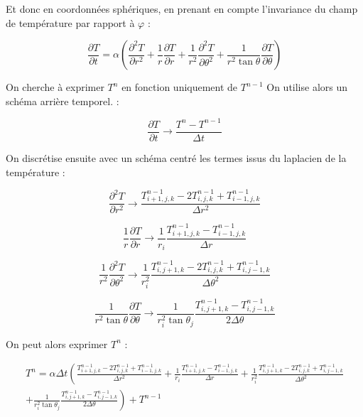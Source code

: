 \documentclass[fleqn]{article}
\renewcommand{\phi}{\varphi}
\begin{document}
Et donc en coordonnées sphériques, en prenant en compte l'invariance du champ de température par rapport à $\phi$  :

\begin{equation}
    \frac{ \partial T}{\partial t}  = \alpha \left( 
    {\frac {\partial ^{2}T}{\partial r^{2}}}+{\frac {1}{r}}{\frac {\partial T}{\partial r}}+{\frac {1}{r^{2}}}{\frac {\partial ^{2}T}{\partial \theta ^{2}}}+{\frac {1}{r^{2}\tan \theta }}{\frac {\partial T}{\partial \theta }} \right)      
\end{equation}

On cherche à exprimer $T^n $ en fonction uniquement de $T^{n-1}$ On utilise alors un schéma arrière temporel. : 

\begin{equation}
    \frac{ \partial T}{\partial t} \rightarrow  \frac{T^n - T^{n-1}}{\Delta t} 
\end{equation}

On discrétise ensuite avec un schéma centré les termes issus du laplacien de la température :


\begin{equation}
    \frac{ \partial ^2 T}{\partial r^2} \rightarrow 
    \frac{T_{i+1,j,k}^{n-1} - 2 T_{i,j,k}^{n-1} + T_{i-1,j,k}^{n-1}}{\Delta r^2}
\end{equation}

\begin{equation}
    \frac{1}{r}\frac{ \partial T}{\partial r} \rightarrow 
    \frac{1}{r_i}\frac{T_{i+1,j,k}^{n-1} - T_{i-1,j,k}^{n-1}}{\Delta r}
\end{equation}

\begin{equation}
    \frac{1}{r^2}\frac{ \partial^2 T}{\partial \theta^2} \rightarrow 
    \frac{1}{r_i^2}\frac{T_{i,j+1,k}^{n-1} - 2 T_{i,j,k}^{n-1} + T_{i,j-1,k}^{n-1}}{\Delta \theta^2}
\end{equation}

\begin{equation}
    \frac{1}{r^2 \tan \theta}\frac{ \partial T}{\partial \theta} \rightarrow 
    \frac{1}{r_i^2 \tan \theta_j }\frac{T_{i,j+1,k}^{n-1} - T_{i,j-1,k}^{n-1}}{2\Delta \theta}
\end{equation}


On peut alors exprimer $T^n$ :

\begin{multline}
    T^n = \alpha \Delta t  \left( \frac{T_{i+1,j,k}^{n-1} - 2 T_{i,j,k}^{n-1} + T_{i-1,j,k}^{n-1}}{\Delta r^2}+\frac{1}{r_i}\frac{T_{i+1,j,k}^{n-1} - T_{i-1,j,k}^{n-1}}{\Delta r} + \frac{1}{r_i^2}\frac{T_{i,j+1,k}^{n-1} - 2 T_{i,j,k}^{n-1} + T_{i,j-1,k}^{n-1}}{\Delta \theta^2}\right. \\
    +\left.\frac{1}{r_i^2 \tan \theta_j }\frac{T_{i,j+1,k}^{n-1} - T_{i,j-1,k}^{n-1}}{2\Delta \theta}\right)  + T^{n-1}
    \label{discretisation Gal}
\end{multline}
\end{document}
